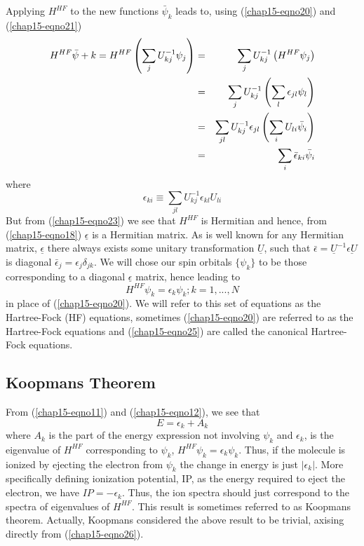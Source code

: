 Applying $H^{HF}$ to the new functions ${\bar{\psi}}_k$ leads to,
using (\ref{chap15-eqno20}) and (\ref{chap15-eqno21})
\begin{eqnarray}
H^{HF} {\bar{\psi}} + k = H^{HF} \left( \sum_{j} U^{-1}_{kj} \psi_j 
\right) &=& \sum_{j} U^{-1}_{kj} \left( H^{HF} \psi_j \right)\cr
&=& \sum_{j} U^{-1}_{kj} \left( \sum_{l} \epsilon_{jl} \psi_l \right)\cr
&=& \sum_{jl} U^{-1}_{kj} \epsilon_{jl} \left( \sum_{i} U_{li} 
{\bar{\psi}}_i \right)\cr
&=& \sum_{i} {\bar{\epsilon}}_{ki} {\bar{\psi}}_i
\end{eqnarray}
where
\begin{equation}
\epsilon_{ki} \equiv \sum_{jl} U^{-1}_{kj} \epsilon_{kl} 
U_{li}
\label{chap15-eqno24}
\end{equation}
But from (\ref{chap15-eqno23}) we see that $H^{HF}$ is Hermitian and
hence, from (\ref{chap15-eqno18}) $\underline{\epsilon}$ is a
Hermitian matrix.  As is well known for any Hermitian matrix,
$\underline{\epsilon}$ there always exists some unitary transformation
$\underline{U}$, such that ${\bar{\epsilon}} =
\underline{U}^{-1} \underline{\epsilon U}$ is diagonal 
${\bar{\epsilon}}_j = \epsilon_j \delta_{jk}$.  We will chose our spin 
orbitals $\{ \psi_k\}$ to be those corresponding to a diagonal
$\underline{\epsilon}$ matrix, hence leading to
\begin{equation}
H^{HF} \psi_k = \epsilon_k \psi_k ; k = 1 , ... , N
\label{chap15-eqno25}
\end{equation}
in place of (\ref{chap15-eqno20}). We will refer to this set of
equations as the Hartree-Fock (HF) equations, sometimes
(\ref{chap15-eqno20}) are referred to as the Hartree-Fock equations
and (\ref{chap15-eqno25}) are called the canonical Hartree-Fock
equations.

\subsection{Koopmans Theorem}

From (\ref{chap15-eqno11}) and (\ref{chap15-eqno12}), we see that
\begin{equation}
E = \epsilon_k + A_k
\label{chap15-eqno26}
\end{equation}
where $A_k$ is the part of the energy expression not involving
$\psi_k$ and $\epsilon_k$, is the eigenvalue of $H^{HF}$ corresponding
to $\psi_k$, $H^{HF} \psi_k = \epsilon_k \psi_k$.  Thus, if the
molecule is ionized by ejecting the electron from $\psi_k$ the change
in energy is just $| \epsilon_k |$.  More specifically defining
ionization potential, IP, as the energy required to eject the
electron, we have $IP = - \epsilon_k$.  Thus, the ion spectra should
just correspond to the spectra of eigenvalues of $H^{HF}$.  This
result is sometimes referred to as Koopmans theorem. Actually,
Koopmans considered the above result to be trivial, axising directly
from (\ref{chap15-eqno26}).

